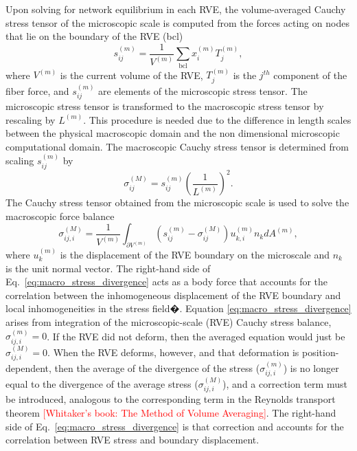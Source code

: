 \documentclass[]{interact}
\newcommand{\red}[1]{\textcolor{red}{[#1]}}
\begin{document}
Upon solving for network equilibrium in each RVE, the volume-averaged Cauchy stress tensor of the microscopic scale is computed from the forces acting on nodes that lie on the boundary of the RVE (bcl) \citep{Chandran:2007hy,Stylianopoulos:2007dp}
%
\begin{equation}
s_{ij}^{(m)} = \frac{1}{V^{(m)}} \sum_{\text{bcl}} x_i^{(m)} T_j^{(m)} ,
\label{eq:micro_stress_discrete}
\end{equation}
%
where $V^{(m)}$ is the current volume of the RVE, $T_j^{(m)}$ is the $j^{th}$ component of the fiber force, and $s_{ij}^{(m)}$ are elements of the microscopic stress tensor. The microscopic stress tensor is transformed to the macroscopic stress tensor by rescaling by $L^{(m)}$. This procedure is needed due to the difference in length scales between the physical macroscopic domain and the non dimensional microscopic computational domain. The macroscopic Cauchy stress tensor is determined from scaling $s_{ij}^{(m)}$ by 
%
\begin{equation}
\sigma_{ij}^{(M)} = s_{ij}^{(m)}\left(\frac{1}{L^{(m)}}\right)^2.
\label{eq:macro_stress_discrete}
\end{equation}
%
The Cauchy stress tensor obtained from the microscopic scale is used to solve the macroscopic force balance \citep{Chandran:2007hy,Stylianopoulos:2007dp}
%
\begin{equation}
\sigma_{ij,i}^{(M)} = \frac{1}{V^{(m)}} \int_{\partial V^{(m)}} \left( s_{ij}^{(m)} - \sigma_{ij}^{(M)} \right)u_{k,i}^{(m)} n_k dA^{(m)},
\label{eq:macro_stress_divergence}
\end{equation}
%
where $u_k^{(m)}$ is the displacement of the RVE boundary on the microscale and $n_k$ is the unit normal vector. The right-hand side of Eq.\ \eqref{eq:macro_stress_divergence} acts as a body force that accounts for the correlation between the inhomogeneous displacement of the RVE boundary and local inhomogeneities in the stress field�\citep{Chandran:2007hy,Stylianopoulos:2007dp}. Equation \eqref{eq:macro_stress_divergence} arises from integration of the microscopic-scale (RVE) Cauchy stress balance, $\sigma_{ij,i}^{(m)} = 0$. If the RVE did not deform, then the averaged equation would just be $\sigma^{(M)}_{ij,i}=0$. When the RVE deforms, however, and that deformation is position-dependent, then the average of the divergence of the stress ($\sigma_{ij,i}^{(m)}$) is no longer equal to the divergence of the average stress ($\sigma_{ij,i}^{(M)}$), and a correction term must be introduced, analogous to the corresponding term in the Reynolds transport theorem \red{Whitaker's book: The Method of Volume Averaging}. The right-hand side of Eq.\ \eqref{eq:macro_stress_divergence} is that correction and accounts for the correlation between RVE stress and boundary displacement.
\end{document}
